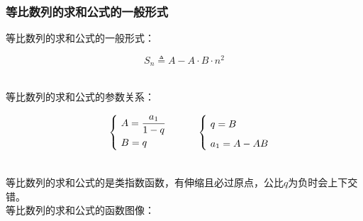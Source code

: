 \documentclass[UTF8]{ctexart}
\begin{document}
\subsubsection{等比数列的求和公式的一般形式}
    \setcounter{equation}{0}
    等比数列的求和公式的一般形式：
    \begin{large}
        \begin{equation*}
            S_n\triangleq A-A\cdot B\cdot n^2
        \end{equation*}
    \end{large}\\
    等比数列的求和公式的参数关系：
    \begin{large}
        \begin{equation*}
            ~~~~~~
            \begin{cases}
                ~A=\dfrac{a_1}{1-q}\\[2mm]
                ~B=q
            \end{cases}~~~~~~
            \begin{cases}
                ~q=B\vphantom{\dfrac{1}{1}}\\[2mm]
                ~a_1=A-AB
            \end{cases}
        \end{equation*}
    \end{large}\\
    等比数列的求和公式的是类指数函数，有伸缩且必过原点，公比$q$为负时会上下交错。\\[3mm]
    等比数列的求和公式的函数图像：
\end{document}
